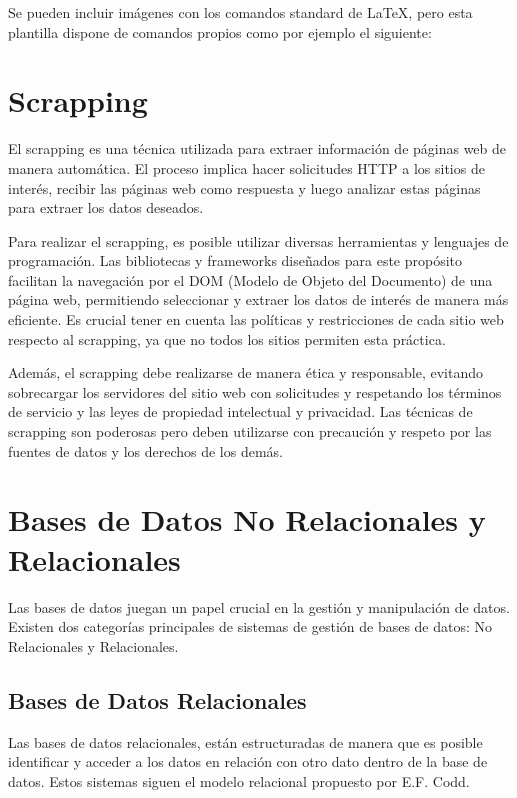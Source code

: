 Se pueden incluir imágenes con los comandos standard de \LaTeX, pero esta plantilla dispone de comandos propios como por ejemplo el siguiente:

\section{Scrapping}

El scrapping es una técnica utilizada para extraer información de páginas web de manera automática. El proceso implica hacer solicitudes HTTP a los sitios de interés, recibir las páginas web como respuesta y luego analizar estas páginas para extraer los datos deseados.

Para realizar el scrapping, es posible utilizar diversas herramientas y lenguajes de programación. Las bibliotecas y frameworks diseñados para este propósito facilitan la navegación por el DOM (Modelo de Objeto del Documento) de una página web, permitiendo seleccionar y extraer los datos de interés de manera más eficiente. Es crucial tener en cuenta las políticas y restricciones de cada sitio web respecto al scrapping, ya que no todos los sitios permiten esta práctica.

Además, el scrapping debe realizarse de manera ética y responsable, evitando sobrecargar los servidores del sitio web con solicitudes y respetando los términos de servicio y las leyes de propiedad intelectual y privacidad. Las técnicas de scrapping son poderosas pero deben utilizarse con precaución y respeto por las fuentes de datos y los derechos de los demás.

\section{Bases de Datos No Relacionales y Relacionales}

Las bases de datos juegan un papel crucial en la gestión y manipulación de datos. Existen dos categorías principales de sistemas de gestión de bases de datos: No Relacionales y Relacionales.

\subsection{Bases de Datos Relacionales}

Las bases de datos relacionales, están estructuradas de manera que es posible identificar y acceder a los datos en relación con otro dato dentro de la base de datos. Estos sistemas siguen el modelo relacional propuesto por E.F. Codd.

